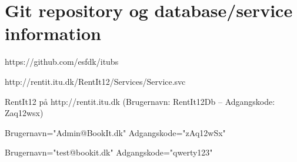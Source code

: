 \section{Git repository og database/service information}
\begin{my_description}
\item[GitHub repository] https://github.com/esfdk/itubs
\item[Service URL] http://rentit.itu.dk/RentIt12/Services/Service.svc
\item[Database] RentIt12 på http://rentit.itu.dk (Brugernavn: RentIt12Db -- Adgangskode: Zaq12wsx)
\item[Test Administrator] Brugernavn="Admin@BookIt.dk" Adgangskode="zAq12wSx"
\item[Test Bruger] Brugernavn="test@bookit.dk" Adgangskode="qwerty123"
\end{my_description}